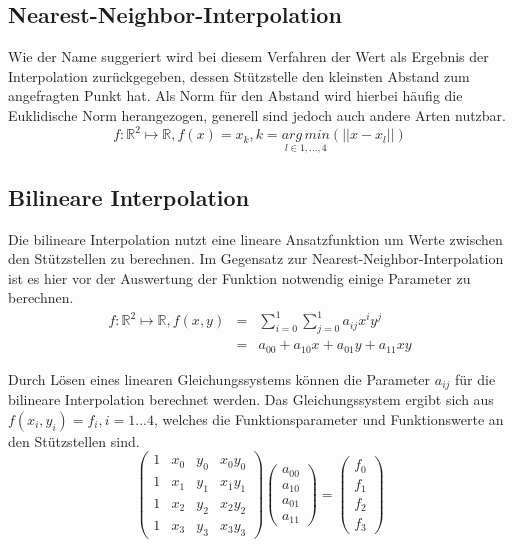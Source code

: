 \subsection*{Nearest-Neighbor-Interpolation}
Wie der Name suggeriert wird bei diesem Verfahren der Wert als Ergebnis der Interpolation zur\"uckgegeben, dessen St\"utzstelle den kleinsten Abstand zum angefragten Punkt hat. Als Norm f\"ur den Abstand wird hierbei h\"aufig die Euklidische Norm herangezogen, generell sind jedoch auch andere Arten nutzbar. 
\begin{equation*}
f: \mathbb{R}^2\mapsto\mathbb{R},f(x)=x_k,k=\underset{{l \in {1,..., 4}}}{arg\,min} (||x-x_l||)
\end{equation*}


\subsection*{Bilineare Interpolation}
Die bilineare Interpolation nutzt eine lineare Ansatzfunktion um Werte zwischen den St\"utzstellen zu berechnen. Im Gegensatz zur Nearest-Neighbor-Interpolation ist es hier vor der Auswertung der Funktion notwendig einige Parameter zu berechnen. 
\begin{eqnarray*}
 f: \mathbb{R}^2\mapsto\mathbb{R}, f(x, y)&=&\sum_{i=0}^1 \sum_{j=0}^1 a_{ij}x^iy^j \\
&=&a_{00}+a_{10}x+a_{01}y+a_{11}xy
\end{eqnarray*}

Durch L\"osen eines linearen Gleichungssystems k\"onnen die Parameter \(a_{ij} \) f\"ur die bilineare Interpolation berechnet werden. Das Gleichungssystem ergibt sich aus \( f(x_i, y_i)=f_i, i=1...4 \), welches die Funktionsparameter und Funktionswerte an den St\"utzstellen sind.
\begin{equation*}
 \begin{pmatrix}
  1 & x_0 & y_0 & x_0y_0 \\
  1 & x_1 & y_1 & x_1y_1 \\
  1 & x_2 & y_2 & x_2y_2 \\
  1 & x_3 & y_3 & x_3y_3
 \end{pmatrix}
 \begin{pmatrix}
  a_{00} \\ a_{10} \\ a_{01} \\ a_{11}
 \end{pmatrix}
 =
 \begin{pmatrix}
  f_0 \\ f_1 \\ f_2 \\ f_3
 \end{pmatrix}
\end{equation*}

